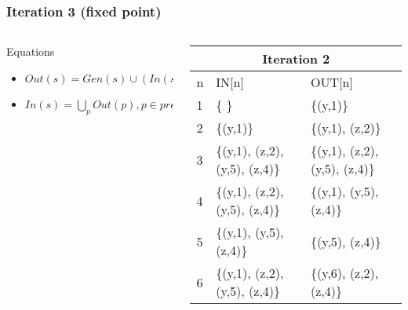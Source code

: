 \begin{frame}[fragile, t]
	\frametitle{Iteration 3 (fixed point)} 
	
	\vspace{-1cm}
	
	\begin{columns}[T]
		\begin{column}[T]{.4\textwidth}
			\begin{center}
				\begin{tiny}
					\begin{minipage}{8cm}
						\begin{block}{Equations}
							\begin{itemize}
								\item $Out(s) = Gen(s) \cup (In(s) - Kill(s))$  
								\item $In(s) = \bigcup_p Out(p), p \in pred(s), s \in stmts$
							\end{itemize}
						\end{block}
					\end{minipage}
				\end{tiny}
			\end{center}
		\end{column}
		\begin{column}[T]{.6\textwidth}
			\begin{tiny}
				\begin{table}[]
					\begin{tabular}{|l|l|l|}
						\hline			
						\multicolumn{3}{|c|}{Iteration 2}\\
						\hline
						n  & IN{[}n{]} & OUT{[}n{]} \\ \hline
						1  & \{ \}                          & \{(y,1)\} \\ \hline
						2  & \{(y,1)\}                      & \{(y,1), (z,2)\} \\ \hline
						3  & \{(y,1), (z,2), (y,5), (z,4)\} & \{(y,1), (z,2), (y,5), (z,4)\} \\ \hline
						4  & \{(y,1), (z,2), (y,5), (z,4)\} & \{(y,1), (y,5), (z,4)\} \\ \hline
						5  & \{(y,1), (y,5), (z,4)\}        & \{(y,5), (z,4)\} \\ \hline
						6  & \{(y,1), (z,2), (y,5), (z,4)\} & \{(y,6), (z,2), (z,4)\} \\ \hline
					\end{tabular}
				\end{table}   
			\end{tiny}
		\end{column}
	\end{columns}
	

\end{frame}
